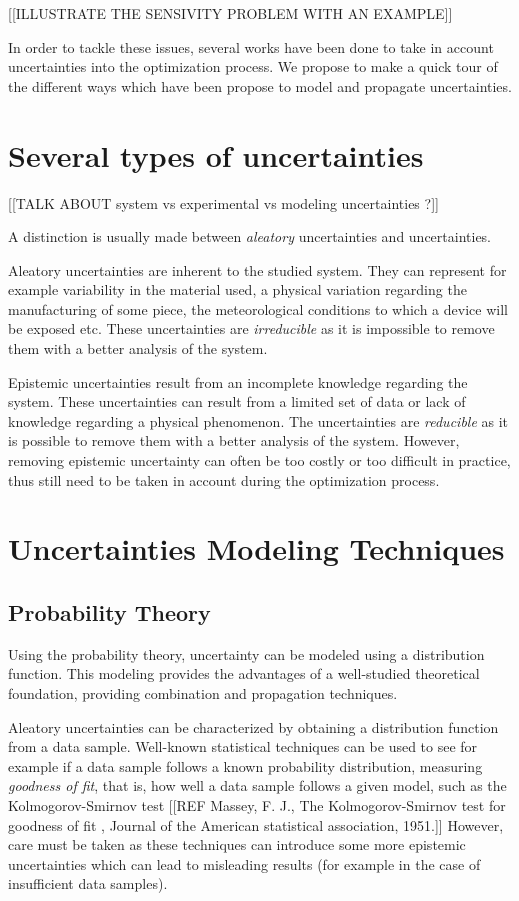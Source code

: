 [[ILLUSTRATE THE SENSIVITY PROBLEM WITH AN EXAMPLE]]

In order to tackle these issues, several works have been done to take in account uncertainties into the optimization process. We propose to make a quick tour of the different ways which have been propose to model and propagate uncertainties.

\section{Several types of uncertainties}

[[TALK ABOUT system vs experimental vs modeling uncertainties ?]]

A distinction is usually made between \emph{aleatory} uncertainties and  uncertainties.

Aleatory uncertainties are inherent to the studied system. They can represent for example variability in the material used, a physical variation regarding the manufacturing of some piece, the meteorological conditions to which a device will be exposed etc.
These uncertainties are \emph{irreducible} as it is impossible to remove them with a better analysis of the system.

Epistemic uncertainties result from an incomplete knowledge regarding the system. These uncertainties can result from a limited set of data or lack of knowledge regarding a physical phenomenon.
The uncertainties are \emph{reducible} as it is possible to remove them with a better analysis of the system. However, removing epistemic uncertainty can often be too costly or too difficult in practice, thus still need to be taken in account during the optimization process.

\section{Uncertainties Modeling Techniques}

\subsection{Probability Theory}

Using the probability theory, uncertainty can be modeled using a distribution function. This modeling provides the advantages of a well-studied theoretical foundation, providing combination and propagation techniques.

Aleatory uncertainties can be characterized by obtaining a distribution function from a data sample.
Well-known statistical techniques can be used to see for example if a data sample follows a known probability distribution, measuring \emph{goodness of fit}, that is, how well a data sample follows a given model, such as the Kolmogorov-Smirnov test [[REF Massey, F. J., The Kolmogorov-Smirnov test for goodness of fit , Journal of the American statistical association, 1951.]]  
However, care must be taken as these techniques can introduce some more epistemic uncertainties which can lead to misleading results (for example in the case of insufficient data samples).

